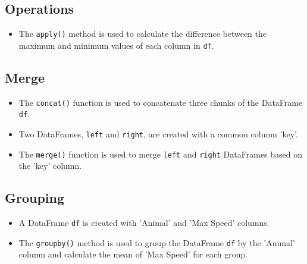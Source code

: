 \subsection{Operations}

\begin{itemize}
	\item The \texttt{apply()} method is used to calculate the difference between the maximum and minimum values of each column in \texttt{df}.
\end{itemize}

\begin{code}[h!]
	    
	
	\caption{Operations Example}
	
\end{code}

\subsection{Merge}

\begin{itemize}
	\item The \texttt{concat()} function is used to concatenate three chunks of the DataFrame \texttt{df}.
	
	\item Two DataFrames, \texttt{left} and \texttt{right}, are created with a common column 'key'.
	
	\item The \texttt{merge()} function is used to merge \texttt{left} and \texttt{right} DataFrames based on the 'key' column.
	
\end{itemize}

\begin{code}[h!]
	    
	
	\caption{Merge Example}
	
\end{code}


\subsection{Grouping}

\begin{itemize}
	\item A DataFrame \texttt{df} is created with 'Animal' and 'Max Speed' columns.
	
	\item The \texttt{groupby()} method is used to group the DataFrame \texttt{df} by the 'Animal' column and calculate the mean of 'Max Speed' for each group.
	
\end{itemize}

